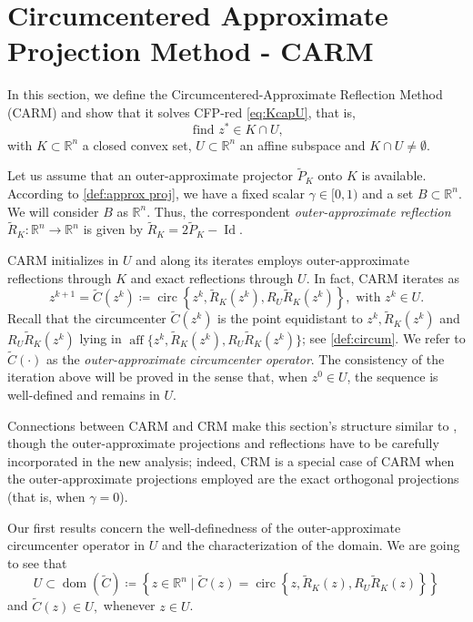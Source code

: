 \documentclass[smallextended,numbook,nospthms]{svjour3}
\theoremstyle{plain}
\theoremstyle{definition}
\def\RR{\mathds R}
\DeclareMathOperator{\Id}{Id}
\DeclareMathOperator{\aff}{aff}
\DeclareMathOperator{\circum}{circ}
\begin{document}
\newpage
\section{Circumcentered Approximate Projection Method - CARM}\label{sec:CARM}
In this section, we  define the Circumcentered-Approximate Reflection Method (CARM) and show that it solves CFP-red \cref{eq:KcapU}, that is,
\[
\text{ find } z^{*}\in K\cap U, 
\]
with $K \subset \RR^{n}$ a closed convex set, $U \subset \RR^{n}$ an affine subspace and $K \cap U \neq \emptyset$.

Let us assume that an outer-approximate projector $\tilde{P}_{K}$ onto $K$ is available. According to \cref{def:approx proj}, we have a fixed scalar $\gamma \in [0,1)$  and a set $B\subset \RR^{n}$. We will consider $B$ as $\RR^{n}$. Thus,  the correspondent \emph{outer-approximate reflection} $\tilde{R}_{K}: \RR^{n} \rightarrow \RR^{n}$ is given by $\tilde{R}_{K}=2 \tilde{P}_{K}-\Id$.

CARM initializes in $U$ and along its iterates employs outer-approximate reflections through $K$ and exact reflections through $U$. In fact, CARM iterates as
$$
z^{k+1}=\tilde{C}\left(z^{k}\right)\coloneqq \circum\left\{z^{k}, \tilde{R}_{K}\left(z^{k}\right), R_{U} \tilde{R}_{K}\left(z^{k}\right)\right\}, \text { with } z^{k} \in U.
$$
Recall that the circumcenter $\tilde{C}(z^{k})$ is the point equidistant to $z^{k}, \tilde{R}_{K}\left(z^{k}\right)$ and  $R_{U} \tilde{R}_{K}\left(z^{k}\right)$ lying in $\aff\{z^{k}, \tilde{R}_{K}\left(z^{k}\right), R_{U} \tilde{R}_{K}\left(z^{k}\right)\}$; see \cref{def:circum}. We refer to $\tilde{C}(\cdot)$ as the \emph{outer-approximate circumcenter operator}. The consistency of the iteration above will be proved in the sense that, when $z^{0}\in U$, the sequence is well-defined and remains in $U$. 

Connections between CARM and CRM make this section's structure similar to \cite[Section 2]{Behling:2020}, though the outer-approximate projections and reflections have to be carefully incorporated in the new analysis; indeed, CRM is a special case of CARM when the outer-approximate projections employed are the exact orthogonal projections (that is, when $\gamma = 0$).

Our first results concern the well-definedness of the outer-approximate circumcenter operator in $U$ and the characterization of the domain. We are going to see that \[U \subset \operatorname{dom}(\tilde{C})\coloneqq \left\{z \in \RR^{n} \mid \tilde{C}(z)=\circum \left\{z, \tilde{R}_{K}(z), R_{U}\tilde{R}_{K}(z)\right\}\right\}\] and $\tilde{C}(z) \in U,$ whenever $z \in U$.
\end{document}
